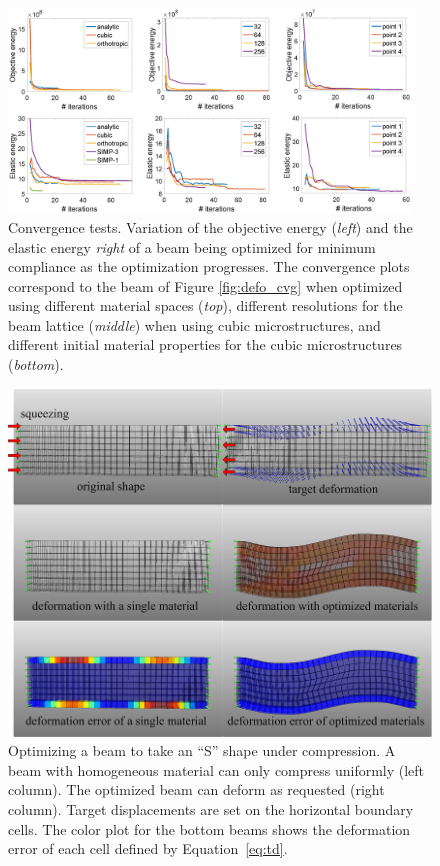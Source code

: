 \begin{figure}[h]
	\centering
	\includegraphics[width=0.95\textwidth]{figs/cvg_test.png}
	\caption{Convergence tests. Variation of the objective energy (\emph{left}) and the elastic energy \emph{right} of a beam being optimized for minimum compliance as the optimization progresses. The convergence plots correspond to the beam of Figure \ref{fig:defo_cvg} when optimized using different material spaces (\emph{top}), different resolutions for the beam lattice (\emph{middle}) when using cubic microstructures, and different initial material properties for the cubic microstructures (\emph{bottom}).}
	\label{plot:cvg}
\end{figure}
\begin{figure}
	\centering
	\includegraphics[width=.5\linewidth]{images/bar_visio_new.png}
	\caption{
		Optimizing a beam to take an ``S'' shape under compression.
		A beam with homogeneous material can only compress uniformly (left column).
		The optimized beam can deform as requested (right column).
		Target displacements are set on the horizontal boundary cells.
		The color plot for the bottom beams shows the deformation error of each cell defined by Equation~\ref{eq:td}.
		\label{fig:beam_S_shape}}
\end{figure}

